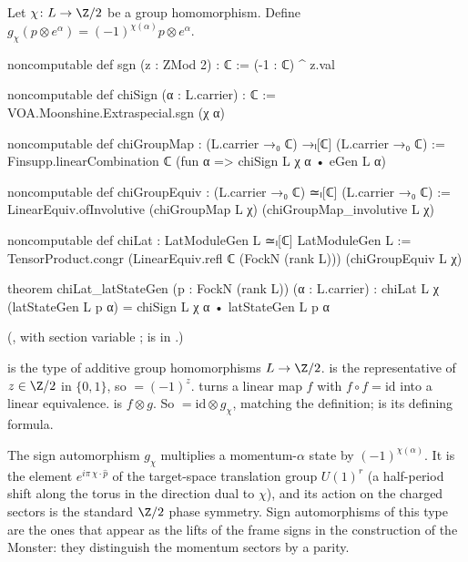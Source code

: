 \begin{definition}\label{ch03:def:chiLat}
Let $\chi\colon L\to\Z/2$ be a group homomorphism. Define $g_\chi(p\otimes e^\alpha)=
(-1)^{\chi(\alpha)}p\otimes e^\alpha$.
\end{definition}
\begin{leancode}
noncomputable def sgn (z : ZMod 2) : ℂ := (-1 : ℂ) ^ z.val

noncomputable def chiSign (α : L.carrier) : ℂ := VOA.Moonshine.Extraspecial.sgn (χ α)

noncomputable def chiGroupMap : (L.carrier →₀ ℂ) →ₗ[ℂ] (L.carrier →₀ ℂ) :=
  Finsupp.linearCombination ℂ (fun α => chiSign L χ α • eGen L α)

noncomputable def chiGroupEquiv : (L.carrier →₀ ℂ) ≃ₗ[ℂ] (L.carrier →₀ ℂ) :=
  LinearEquiv.ofInvolutive (chiGroupMap L χ) (chiGroupMap_involutive L χ)

noncomputable def chiLat : LatModuleGen L ≃ₗ[ℂ] LatModuleGen L :=
  TensorProduct.congr (LinearEquiv.refl ℂ (FockN (rank L))) (chiGroupEquiv L χ)

theorem chiLat_latStateGen (p : FockN (rank L)) (α : L.carrier) :
    chiLat L χ (latStateGen L p α) = chiSign L χ α • latStateGen L p α
\end{leancode}
(, with section variable ;
 is in .)

\begin{dictionary}
 is the type of additive group homomorphisms $L\to\Z/2$.
 is the representative of $z\in\Z/2$ in $\{0,1\}$, so  $=(-1)^z$.
 turns a linear map $f$ with $f\circ f=\mathrm{id}$ into a linear
equivalence.  is $f\otimes g$. So  $=\mathrm{id}\otimes
g_\chi$, matching the definition;  is its defining formula.
\end{dictionary}

\begin{physics}
The sign automorphism $g_\chi$ multiplies a momentum-$\alpha$ state by $(-1)^{\chi(\alpha)}$. It is the element $e^{i\pi\,\chi\cdot\hat p}$ of the target-space translation group $U(1)^r$ (a half-period shift along the torus in the direction dual to $\chi$), and its action on the charged sectors is the standard $\Z/2$ phase symmetry. Sign automorphisms of this type are the ones that appear as the lifts of the frame signs in the construction of the Monster: they distinguish the momentum sectors by a parity.
\end{physics}

